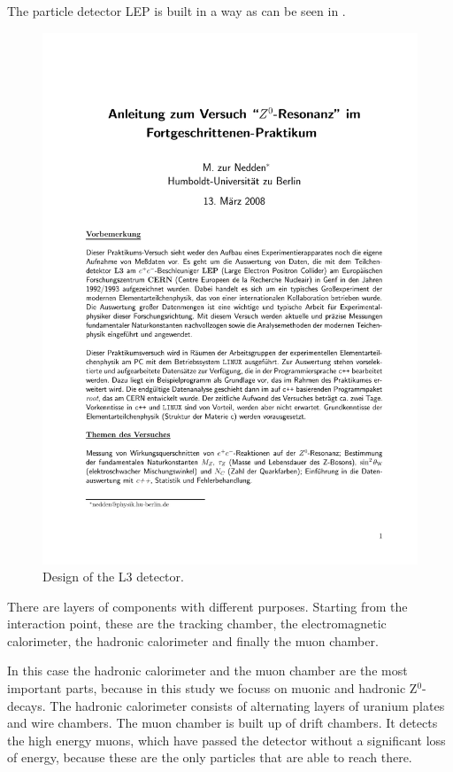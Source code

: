 \documentclass[epj,nopacs]{svjour}
\begin{document}
The particle detector LEP is built in a way as can be seen in .
\begin{figure}[htb]
 \centering
 \includegraphics[page=5,viewport=286 620 508 765,clip,%
  width=\columnwidth,keepaspectratio]{../../Z0/docs/Z0ResFprakt}
 \caption{Design of the L3 detector.}%
 \label{fig:aufbau}
\end{figure}
There are layers of components with different purposes. Starting from the
interaction point, these are the tracking chamber, the electromagnetic
calorimeter, the hadronic calorimeter and finally the muon chamber.

In this case the hadronic calorimeter and the muon chamber are the most
important parts, because in this study we focuss on muonic and hadronic
Z$^0$-decays. The hadronic calorimeter consists of alternating layers of
uranium plates and wire chambers. The muon chamber is built up of drift
chambers. It detects the high energy muons, which have passed the detector
without a significant loss of energy, because these are the only particles that
are able to reach there.
\end{document}
